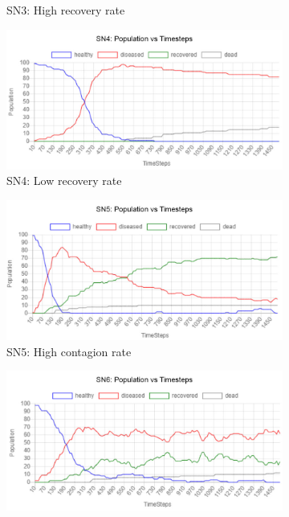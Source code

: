 \documentclass[a4paper,11pt]{article}
\begin{document}
\begin{figure}[H]
\begin{subfigure}[b]{0.49\linewidth}
            \caption{SN3: High recovery rate}
            \label{fig:SN3}
        \end{subfigure}
        \begin{subfigure}[b]{0.49\linewidth}
            \includegraphics[width=\linewidth]{pop_graphs/SN4_pop.jpg}
            \caption{SN4: Low recovery rate}
            \label{fig:SN4}
        \end{subfigure}
        \begin{subfigure}[b]{0.49\linewidth}
            \includegraphics[width=\linewidth]{pop_graphs/SN5_pop.jpg}
            \caption{SN5: High contagion rate}
            \label{fig:SN5}
        \end{subfigure}
        \begin{subfigure}[b]{0.49\linewidth}
            \includegraphics[width=\linewidth]{pop_graphs/SN6_pop.jpg}

\end{subfigure}
\end{figure}
\end{document}
